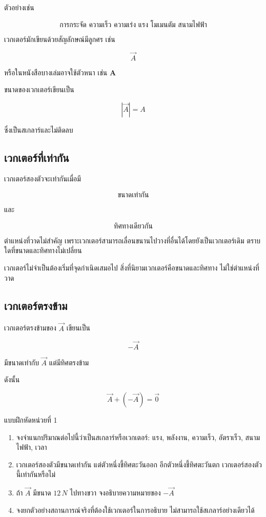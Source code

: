 \documentclass[12pt,a4paper]{report}
\begin{document}
ตัวอย่างเช่น

\[
\text{การกระจัด ความเร็ว ความเร่ง แรง โมเมนตัม สนามไฟฟ้า}
\]

เวกเตอร์มักเขียนด้วยสัญลักษณ์มีลูกศร เช่น

\[
\vec{A}
\]

หรือในหนังสือบางเล่มอาจใช้ตัวหนา เช่น $\mathbf{A}$

ขนาดของเวกเตอร์เขียนเป็น

\[
|\vec{A}|=A
\]

ซึ่งเป็นสเกลาร์และไม่ติดลบ

\subsection{เวกเตอร์ที่เท่ากัน}

เวกเตอร์สองตัวจะเท่ากันเมื่อมี

\[
\text{ขนาดเท่ากัน}
\]

และ

\[
\text{ทิศทางเดียวกัน}
\]

ตำแหน่งที่วาดไม่สำคัญ เพราะเวกเตอร์สามารถเลื่อนขนานไปวางที่อื่นได้โดยยังเป็นเวกเตอร์เดิม ตราบใดที่ขนาดและทิศทางไม่เปลี่ยน

\begin{tcolorbox}[title=ข้อควรจำ]
เวกเตอร์ไม่จำเป็นต้องเริ่มที่จุดกำเนิดเสมอไป สิ่งที่นิยามเวกเตอร์คือขนาดและทิศทาง ไม่ใช่ตำแหน่งที่วาด
\end{tcolorbox}

\subsection{เวกเตอร์ตรงข้าม}

เวกเตอร์ตรงข้ามของ $\vec{A}$ เขียนเป็น

\[
-\vec{A}
\]

มีขนาดเท่ากับ $\vec{A}$ แต่มีทิศตรงข้าม

ดังนั้น

\[
\vec{A}+(-\vec{A})=\vec{0}
\]

\begin{exercisebox}{แบบฝึกหัดหน่วยที่ 1}
\begin{enumerate}
    \item จงจำแนกปริมาณต่อไปนี้ว่าเป็นสเกลาร์หรือเวกเตอร์: แรง, พลังงาน, ความเร็ว, อัตราเร็ว, สนามไฟฟ้า, เวลา
    \item เวกเตอร์สองตัวมีขนาดเท่ากัน แต่ตัวหนึ่งชี้ทิศตะวันออก อีกตัวหนึ่งชี้ทิศตะวันตก เวกเตอร์สองตัวนี้เท่ากันหรือไม่
    \item ถ้า $\vec{A}$ มีขนาด $12\,\si{N}$ ไปทางขวา จงอธิบายความหมายของ $-\vec{A}$
    \item จงยกตัวอย่างสถานการณ์จริงที่ต้องใช้เวกเตอร์ในการอธิบาย ไม่สามารถใช้สเกลาร์อย่างเดียวได้
\end{enumerate}
\end{exercisebox}
\end{document}
